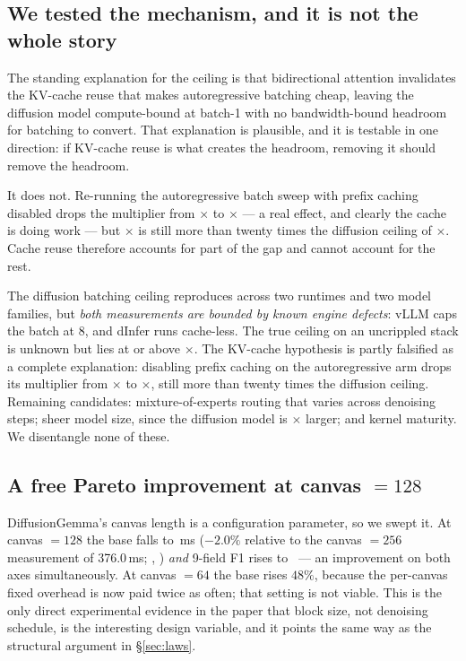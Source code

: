 \subsection{We tested the mechanism, and it is not the whole story}

The standing explanation for the ceiling is that bidirectional attention
invalidates the KV-cache reuse that makes autoregressive batching cheap,
leaving the diffusion model compute-bound at batch-1 with no bandwidth-bound
headroom for batching to convert. That explanation is plausible, and it is
testable in one direction: if KV-cache reuse is what creates the headroom,
removing it should remove the headroom.

It does not. Re-running the autoregressive batch sweep with prefix caching
disabled drops the multiplier from \cacheOnMult$\times$ to
\cacheOffMult$\times$ --- a real effect, and clearly the cache is doing work
--- but \cacheOffMult$\times$ is still more than twenty times the diffusion
ceiling of \dgBatchMult$\times$. Cache reuse therefore accounts for part of
the gap and cannot account for the rest.

\begin{caution}
The diffusion batching ceiling reproduces across two runtimes and two model
families, but \emph{both measurements are bounded by known engine defects}:
vLLM caps the batch at 8, and dInfer runs cache-less. The true ceiling on an
uncrippled stack is unknown but lies at or above \dgBatchVllmHi$\times$.
The KV-cache hypothesis is partly falsified as a complete explanation:
disabling prefix caching on the autoregressive arm drops its multiplier from
\cacheOnMult$\times$ to \cacheOffMult$\times$, still more than twenty times
the diffusion ceiling. Remaining candidates: mixture-of-experts routing that
varies across denoising steps; sheer model size, since the diffusion model
is \footprintRatio$\times$ larger; and kernel maturity. We disentangle none
of these.
\end{caution}

\subsection{A free Pareto improvement at canvas $= 128$}

DiffusionGemma's canvas length is a configuration parameter, so we swept it.
At canvas $=128$ the base falls to \canvasOneTwentyEightBase\,ms
($-2.0\%$ relative to the canvas $=256$ measurement of 376.0\,ms;
,
) \emph{and} 9-field F1 rises to
\canvasOneTwentyEightFone\ --- an improvement on both axes simultaneously.
At canvas $=64$ the base rises $48\%$, because the per-canvas fixed overhead
is now paid twice as often; that setting is not viable. This is the only
direct experimental evidence in the paper that block size, not denoising
schedule, is the interesting design variable, and it points the same way as
the structural argument in \S\ref{sec:laws}.

